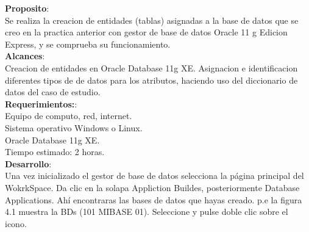 \documentclass[12pt,letterpaper]{article}
\begin{document}
\textbf{Proposito}:\\
Se realiza la creacion de entidades (tablas) asignadas a la base de datos que se
creo en la practica anterior con gestor de base de datos Oracle 11 g Edicion
Express, y se comprueba su funcionamiento.\\
\textbf{Alcances}:\\
Creacion de entidades en Oracle Database 11g XE.
Asignacion e identificacion diferentes tipos de de datos para los atributos, haciendo
uso del diccionario de datos del caso de estudio. \\
\textbf{Requerimientos:}:\\
Equipo de computo, red, internet.\\
Sistema operativo Windows o Linux.\\
Oracle Database 11g XE.\\
Tiempo estimado: 2 horas.\\
\textbf{Desarrollo}:\\
Una vez inicializado el gestor de base de datos selecciona la página principal del
WokrkSpace. Da clic en la solapa Appliction Buildes, posteriormente Database
Applications. Ahí encontraras las bases de datos que hayas creado. p.e la figura
4.1 muestra la BDs (101 MIBASE 01). Seleccione y pulse doble clic sobre el
icono.
\end{document}
